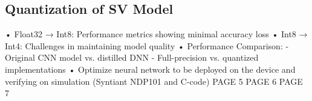 \subsection{Quantization of SV Model}
\label{sec:quantization}
• Float32 → Int8: Performance metrics showing minimal accuracy loss\newline
• Int8 → Int4: Challenges in maintaining model quality\newline
• Performance Comparison:\newline
    - Original CNN model vs. distilled DNN\newline
    - Full-precision vs. quantized implementations\newline
• Optimize neural network to be deployed on the device and verifying on simulation (Syntiant NDP101 and C-code)\newline\newline
\newpage
PAGE 5
\newpage
PAGE 6
\newpage 
PAGE 7
\newpage 